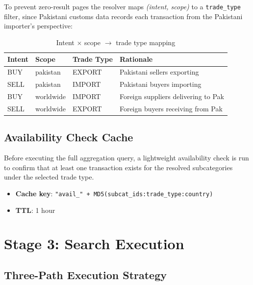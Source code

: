 \documentclass[12pt,a4paper]{article}
\begin{document}
To prevent zero-result pages the resolver maps \emph{(intent, scope)} to a
\texttt{trade\_type} filter, since Pakistani customs data records each transaction from
the Pakistani importer's perspective:

\begin{table}[H]
\centering
\renewcommand{\arraystretch}{1.3}
\begin{tabular}{llll}
\toprule
\rowcolor{tableheader!20}
\textbf{Intent} & \textbf{Scope} & \textbf{Trade Type} & \textbf{Rationale} \\
\midrule
BUY  & pakistan  & EXPORT & Pakistani sellers exporting \\
SELL & pakistan  & IMPORT & Pakistani buyers importing \\
BUY  & worldwide & IMPORT & Foreign suppliers delivering to Pak \\
SELL & worldwide & EXPORT & Foreign buyers receiving from Pak \\
\bottomrule
\end{tabular}
\caption{Intent $\times$ scope $\rightarrow$ trade type mapping}
\end{table}

\subsection{Availability Check Cache}

Before executing the full aggregation query, a lightweight availability check is run to
confirm that at least one transaction exists for the resolved subcategories under the
selected trade type.

\begin{itemize}
  \item \textbf{Cache key}: \texttt{"avail\_" + MD5(subcat\_ids:trade\_type:country)}
  \item \textbf{TTL}: 1 hour
\end{itemize}

\newpage
\section{Stage 3: Search Execution}
\label{sec:execution}

\subsection{Three-Path Execution Strategy}
\end{document}
